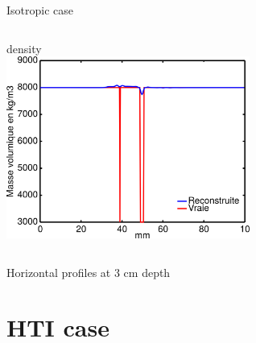 \documentclass[10pt,xcolor=x11names,compress, notes=show]{beamer}%
\begin{document}
\begin{frame}{Isotropic case}
\begin{itemize}
\begin{columns}
		\centering
		\small{density} \\[0.2cm]
		\includegraphics[width=0.6\textwidth]{img/multi/coupe_rho_multi.png}\\
	\end{columns}	
\end{itemize}
\centering
\hspace{3cm}Horizontal profiles at 3 cm depth
\end{frame}

\section{HTI case}
\end{document}
